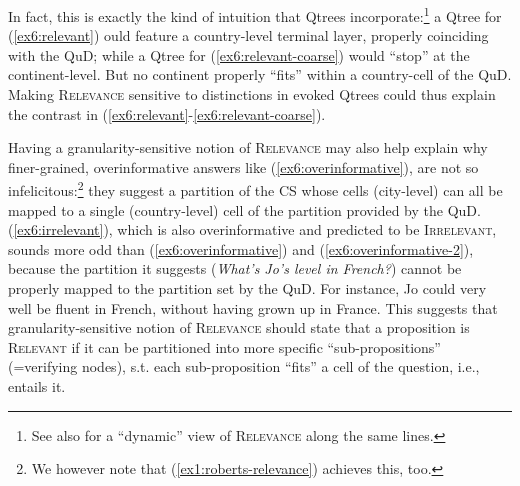 \begin{exe}
	\begin{xlist}
		\label{ex6:relevant}
		\label{ex6:relevant-coarse}
		\label{ex6:overinformative}
		\label{ex6:irrelevant}
	\end{xlist}
	\label{ex6:relevant-answers}
\end{exe}

In fact, this is exactly the kind of intuition that Qtrees incorporate:\footnote{See also \cite{Benbaji2024} for a ``dynamic'' view of \textsc{Relevance} along the same lines.} a Qtree for (\ref{ex6:relevant}) ould feature a country-level terminal layer, properly coinciding with the QuD; while a Qtree for (\ref{ex6:relevant-coarse}) would ``stop'' at the continent-level. But no continent properly ``fits'' within a country-cell of the QuD. Making \textsc{Relevance} sensitive to distinctions in evoked Qtrees could thus explain the contrast in (\ref{ex6:relevant}-\ref{ex6:relevant-coarse}).


Having a granularity-sensitive notion of \textsc{Relevance} may also help explain why finer-grained, overinformative answers like (\ref{ex6:overinformative}), are not so infelicitous:\footnote{We however note that (\ref{ex1:roberts-relevance}) achieves this, too.} they suggest a partition of the CS whose cells (city-level) can all be mapped to a single (country-level) cell of the partition provided by the QuD. (\ref{ex6:irrelevant}), which is also overinformative and predicted to be \textsc{Irrelevant}, sounds more odd than (\ref{ex6:overinformative}) and (\ref{ex6:overinformative-2}), because the partition it suggests (\textit{What's Jo's level in French?}) cannot be properly mapped to the partition set by the QuD. For instance, Jo could very well be fluent in French, without having grown up in France. This suggests that granularity-sensitive notion of \textsc{Relevance} should state that a proposition is \textsc{Relevant} if it can be partitioned into more specific ``sub-propositions'' (=verifying nodes), s.t. each sub-proposition ``fits'' a cell of the question, i.e., entails it.



